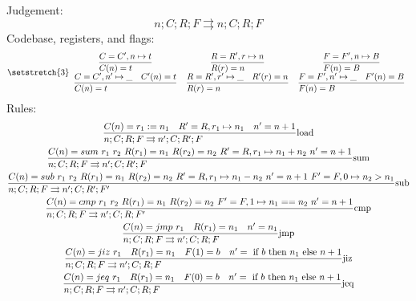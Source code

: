 \documentclass{article}
\newcommand{\execs}[0]{\ensuremath{\rightrightarrows}}
\begin{document}
Judgement:
\begin{equation*}
    n;C;R;F \rightrightarrows n;C;R;F
\end{equation*}
Codebase, registers, and flags:
\[\setstretch{3} \begin{array}{ccc}
    \st[]{C(n)=t}{C=C',n\mapsto t} &
    \st[]{R(r)=n}{R=R',r\mapsto n} &
    \st[]{F(n)=B}{F=F',n\mapsto B} \\
    \st[]{C(n)=t}{C=C',n'\mapsto \_\quad C'(n)=t} &
    \st[]{R(r)=n}{R=R',r'\mapsto \_\quad R'(r)=n} &
    \st[]{F(n)=B}{F=F',n'\mapsto \_\quad F'(n)=B} \\
\end{array}\]
Rules:
\begin{gather*}
    \st[load]{n;C;R;F \execs n';C;R';F}{C(n)=r_1:=n_1 \quad R'=R,r_1\mapsto n_1 \quad n'=n+1} \\
    \st[sum]{n;C;R;F \execs n';C;R';F}{
        C(n)=sum\ r_1\ r_2 \ 
        R(r_1)=n_1 \ 
        R(r_2)=n_2 \ 
        R'=R,r_1\mapsto n_1+n_2 \ 
        n'=n+1
    } \\
    \st[sub]{n;C;R;F \execs n';C;R';F'}{
        C(n)=sub\ r_1\ r_2 \ 
        R(r_1)=n_1 \ 
        R(r_2)=n_2 \ 
        R'=R,r_1\mapsto n_1-n_2 \ 
        n'=n+1 \
        F'=F,0\mapsto n_2>n_1
    } \\
    \st[cmp]{n;C;R;F \execs n';C;R;F'}{
        C(n)=cmp\ r_1\ r_2 \ 
        R(r_1)=n_1 \ 
        R(r_2)=n_2 \ 
        F'=F,1\mapsto n_1==n_2 \
        n'=n+1
    } \\
    \st[jmp]{n;C;R;F \execs n';C;R;F}{
        C(n)=jmp\ r_1 \quad
        R(r_1)=n_1 \quad
        n'=n_1
    } \\
    \st[jiz]{n;C;R;F \execs n';C;R;F}{
        C(n)=jiz\ r_1 \quad
        R(r_1)=n_1 \quad
        F(1)=b \quad
        n'=\IF b \THEN n_1 \ELSE n+1
    } \\
    \st[jeq]{n;C;R;F \execs n';C;R;F}{
        C(n)=jeq\ r_1 \quad
        R(r_1)=n_1 \quad
        F(0)=b \quad
        n'=\IF b \THEN n_1 \ELSE n+1
    } \\
\end{gather*}
\end{document}
